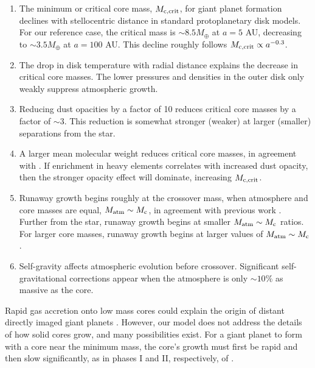 \documentclass[apj, numberedappendix]{emulateapj}
\newcommand{\co}{_{\rm c}}
\def\crit{_{\rm{c, crit}}}
\begin{document}
\begin{enumerate}
\item The minimum or critical core mass, $M\crit$, for giant planet formation declines with stellocentric distance in standard protoplanetary disk models.  For our reference case, the critical mass is $\sim$$8.5 M_{\oplus}$ at $a = 5$ AU, decreasing to $\sim$$3.5 M_{\oplus}$ at $a =100$ AU.  This decline roughly follows $M\crit \propto a^{-0.3}$.

\item The drop in disk temperature with radial distance explains the decrease in critical core masses.  The lower pressures and densities in the outer disk only weakly suppress atmospheric growth.

\item Reducing dust opacities by a factor of 10 reduces critical core masses by a factor of $\sim$$3$.  This reduction is somewhat stronger (weaker) at larger (smaller) separations from the star.

\item A larger mean molecular weight reduces critical core masses, in agreement with \citet{HorIko11}.  If enrichment in heavy elements correlates with increased dust opacity, then the stronger opacity effect will dominate, increasing $M\crit$.

\item Runaway growth begins roughly at the crossover mass, when atmosphere and core masses are equal, $M_{\rm atm} \sim M\co$, in agreement with previous work \citep{pollack96}.  Further from the star, runaway growth begins at smaller $M_{\rm atm} \sim M\co$ ratios.  For larger core masses, runaway growth begins at larger values of $M_{\rm atm} \sim M\co$.

\item Self-gravity affects atmospheric evolution before crossover.  Significant self-gravitational corrections appear when the atmosphere is only $\sim$$10 \%$ as massive as the core.

\end{enumerate}

Rapid gas accretion onto low mass cores could explain the origin of distant directly imaged giant planets \citep{marois08, lagrange10}.  However, our model does not address the details of how solid cores grow, and many possibilities exist.  For a giant planet to form with a core near the minimum mass, the core's growth must  first be rapid and then slow significantly, as in phases I and II, respectively, of \cite{pollack96}.   
\end{document}
